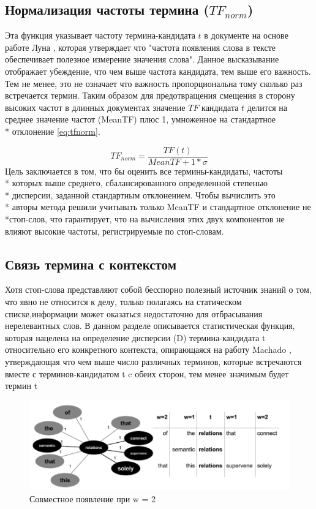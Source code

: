 \subsection{Нормализация частоты термина ($TF_{norm}$)}
Эта функция указывает частоту  термина-кандидата $t$ в документе на основе работе Луна \cite{18}, которая утверждает что "частота появления слова в тексте обеспечивает полезное измерение значения слова".
Данное высказывание отображает убеждение, что чем выше частота кандидата, тем выше его важность.
Тем не менее, это не означает что важность пропорциональна тому сколько раз встречается термин.
Таким образом для предотвращения смещения в сторону высоких частот в длинных документах значение $TF$ кандидата $t$ делится на среднее значение частот (MeanTF) плюс 1, умноженное на стандартное \\* отклонение \eqref{eq:tfnorm}.

\begin{equation}
	\label{eq:tfnorm}
	TF_{norm} = \frac{TF(t)}{MeanTF + 1 * \sigma}
\end{equation} 
Цель заключается в том, что бы оценить все термины-кандидаты, частоты \\* которых выше среднего, сбалансированного определенной степенью \\* дисперсии, заданной стандартным отклонением.
Чтобы вычислить это \\* авторы метода решили учитывать только MeanTF и стандартное отклонение не \\*стоп-слов, что гарантирует, что на вычисления этих двух компонентов не влияют высокие частоты, регистрируемые по стоп-словам.

\subsection{Связь термина с контекстом}
Хотя стоп-слова представляют собой бесспорно полезный источник знаний о том, что явно не относится к делу, только полагаясь на статическом списке,информации может оказаться недостаточно для отбрасывания нерелевантных слов.
В данном разделе описывается статистическая функция, которая нацелена на определение дисперсии (D) термина-кандидата t относительно его конкретного контекста, опирающаяся на работу Machado \cite{19}, утверждающая что чем выше число различных терминов, которые встречаются вместе с терминов-кандидатом t c обеих сторон, тем менее значимым будет термин t

\begin{figure}[!h]
	\centering
	\includegraphics[width=0.7\linewidth]{src/img/coocurrences_example}
	\caption{Совместное появление при w = 2}
	\label{fig:coocurrencesexample}
\end{figure}

